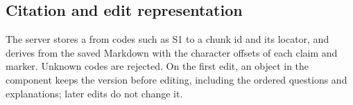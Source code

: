 \subsection{Citation and edit representation}
The server stores a  from codes such as S1 to a chunk id and its locator, and derives  from the saved Markdown with the character offsets of each claim and marker. Unknown codes are rejected. On the first edit, an  object in the component keeps the version before editing, including the ordered questions and explanations; later edits do not change it.

